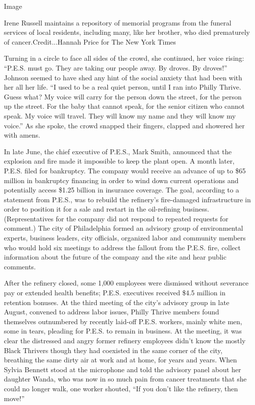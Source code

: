 Image

Irene Russell maintains a repository of memorial programs from the
funeral services of local residents, including many, like her brother,
who died prematurely of cancer.Credit...Hannah Price for The New York
Times

Turning in a circle to face all sides of the crowd, she continued, her
voice rising: ``P.E.S. must go. They are taking our people away. By
droves. By droves!'' Johnson seemed to have shed any hint of the social
anxiety that had been with her all her life. ``I used to be a real quiet
person, until I ran into Philly Thrive. Guess what? My voice will carry
for the person down the street, for the person up the street. For the
baby that cannot speak, for the senior citizen who cannot speak. My
voice will travel. They will know my name and they will know my voice.''
As she spoke, the crowd snapped their fingers, clapped and showered her
with amens.

In late June, the chief executive of P.E.S., Mark Smith, announced that
the explosion and fire made it impossible to keep the plant open. A
month later, P.E.S. filed for bankruptcy. The company would receive an
advance of up to \$65 million in bankruptcy financing in order to wind
down current operations and potentially access \$1.25 billion in
insurance coverage. The goal, according to a statement from P.E.S., was
to rebuild the refinery's fire-damaged infrastructure in order to
position it for a sale and restart in the oil-refining business.
(Representatives for the company did not respond to repeated requests
for comment.) The city of Philadelphia formed an advisory group of
environmental experts, business leaders, city officials, organized labor
and community members who would hold six meetings to address the fallout
from the P.E.S. fire, collect information about the future of the
company and the site and hear public comments.

After the refinery closed, some 1,000 employees were dismissed without
severance pay or extended health benefits; P.E.S. executives received
\$4.5 million in retention bonuses. At the third meeting of the city's
advisory group in late August, convened to address labor issues, Philly
Thrive members found themselves outnumbered by recently laid-off P.E.S.
workers, mainly white men, some in tears, pleading for P.E.S. to remain
in business. At the meeting, it was clear the distressed and angry
former refinery employees didn't know the mostly Black Thrivers though
they had coexisted in the same corner of the city, breathing the same
dirty air at work and at home, for years and years. When Sylvia Bennett
stood at the microphone and told the advisory panel about her daughter
Wanda, who was now in so much pain from cancer treatments that she could
no longer walk, one worker shouted, ``If you don't like the refinery,
then move!''

